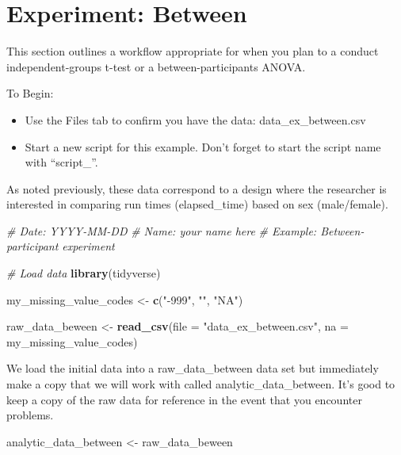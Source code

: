 \documentclass[
]{krantz}
\makeatletter
\newenvironment{Shaded}{\begin{snugshade}}{\end{snugshade}}
\newcommand{\CommentTok}[1]{\textcolor[rgb]{0.37,0.37,0.37}{\textit{#1}}}
\newcommand{\DataTypeTok}[1]{\textcolor[rgb]{0.27,0.27,0.27}{#1}}
\newcommand{\KeywordTok}[1]{\textcolor[rgb]{0.27,0.27,0.27}{\textbf{#1}}}
\newcommand{\NormalTok}[1]{#1}
\newcommand{\StringTok}[1]{\textcolor[rgb]{0.5,0.5,0.5}{#1}}
\newenvironment{kframe}{%
\medskip{}
\setlength{\fboxsep}{.8em}
 \def\at@end@of@kframe{}%
 \ifinner\ifhmode%
  \def\at@end@of@kframe{\end{minipage}}%
  \begin{minipage}{\columnwidth}%
 \fi\fi%
 \def\FrameCommand##1{\hskip\@totalleftmargin \hskip-\fboxsep
 \colorbox{shadecolor}{##1}\hskip-\fboxsep
     \hskip-\linewidth \hskip-\@totalleftmargin \hskip\columnwidth}%
 \MakeFramed {\advance\hsize-\width
   \@totalleftmargin\z@ \linewidth\hsize
   \@setminipage}}%
 {\par\unskip\endMakeFramed%
 \at@end@of@kframe}
\renewenvironment{Shaded}{\begin{kframe}}{\end{kframe}}
\makeatother
\begin{document}
\hypertarget{experiment-between}{%
\section{Experiment: Between}\label{experiment-between}}

This section outlines a workflow appropriate for when you plan to a conduct independent-groups t-test or a between-participants ANOVA.

To Begin:

\begin{itemize}
\item
  Use the Files tab to confirm you have the data: data\_ex\_between.csv
\item
  Start a new script for this example. Don't forget to start the script name with ``script\_''.
\end{itemize}

As noted previously, these data correspond to a design where the researcher is interested in comparing run times (elapsed\_time) based on sex (male/female).

\begin{Shaded}
\begin{Highlighting}[]
\CommentTok{# Date: YYYY-MM-DD}
\CommentTok{# Name: your name here}
\CommentTok{# Example: Between-participant experiment}

\CommentTok{# Load data}
\KeywordTok{library}\NormalTok{(tidyverse)}

\NormalTok{my_missing_value_codes <-}\StringTok{ }\KeywordTok{c}\NormalTok{(}\StringTok{"-999"}\NormalTok{, }\StringTok{""}\NormalTok{, }\StringTok{"NA"}\NormalTok{)}

\NormalTok{raw_data_beween <-}\StringTok{ }\KeywordTok{read_csv}\NormalTok{(}\DataTypeTok{file =} \StringTok{"data_ex_between.csv"}\NormalTok{,}
                     \DataTypeTok{na =}\NormalTok{ my_missing_value_codes)}
\end{Highlighting}
\end{Shaded}

We load the initial data into a raw\_data\_between data set but immediately make a copy that we will work with called analytic\_data\_between. It's good to keep a copy of the raw data for reference in the event that you encounter problems.

\begin{Shaded}
\begin{Highlighting}[]
\NormalTok{analytic_data_between <-}\StringTok{ }\NormalTok{raw_data_beween}
\end{Highlighting}
\end{Shaded}
\end{document}
